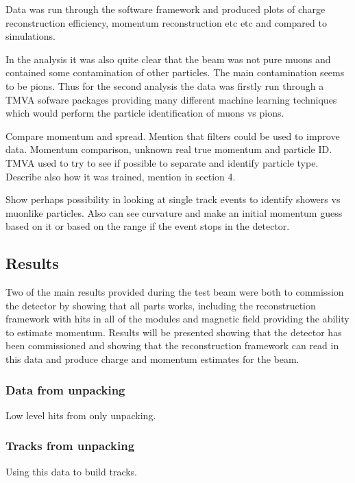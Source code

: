 Data was run through the software framework and produced plots of charge reconstruction efficiency, momentum reconstruction etc etc and compared to simulations.

In the analysis it was also quite clear that the beam was not pure muons and contained some contamination of other particles. The main contamination seems to be pions. Thus for the second analysis the data was firstly run through a TMVA sofware packages providing many different machine learning techniques which would perform the particle identification of muons vs pions.





Compare momentum and spread. Mention that filters could be used to improve data. Momentum comparison, unknown real true momentum and particle ID. TMVA used to try to see if possible to separate and identify particle type. Describe also how it was trained, mention in section 4.

Show perhaps possibility in looking at single track events to identify showers vs muonlike particles. Also can see curvature and make an initial momentum guess based on it or based on the range if the event stops in the detector.


\subsection{Results}
Two of the main results provided during the test beam were both to commission the detector by showing that all parts works, including the reconstruction framework with hits in all of the modules and magnetic field providing the ability to estimate momentum. Results will be presented showing that the detector has been commissioned and showing that the reconstruction framework can read in this data and produce charge and momentum estimates for the beam.

\subsubsection{Data from unpacking}
Low level hits from only unpacking.

\subsubsection{Tracks from unpacking}
Using this data to build tracks.
\fi

